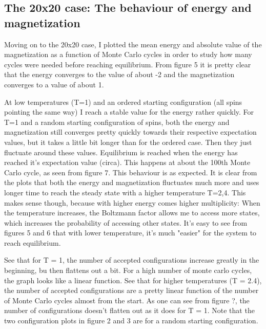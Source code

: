 \documentclass[twocolumn]{article}
\begin{document}
\subsection{The 20x20 case: The behaviour of energy and magnetization}

Moving on to the 20x20 case, I plotted the mean energy and absolute value of the magnetization as a function of Monte Carlo cycles in order to study how many cycles were needed before reaching equilibrium. From figure 5 it is pretty clear that the energy converges to the value of about -2 and the magnetization converges to a value of about 1.\newline

At low temperatures (T=1) and an ordered starting configuration (all spins pointing the same way) I reach a stable value for the energy rather quickly.  
For T=1 and a random starting configuration of spins, both the energy and magnetization still converges pretty quickly towards their respective expectation values, but it takes a little bit longer than for the ordered case. Then they just fluctuate around these values. Equilibrium is reached when the energy has reached it's expectation value (circa). This happens at about the 100th Monte Carlo cycle, as seen from figure 7. This behaviour is as expected.\newline
It is clear from the plots that both the energy and magnetization fluctuates much more and uses longer time to reach the steady state with a higher temperature T=2,4. This makes sense though, because with higher energy comes higher multiplicity: When the temperature increases, the Boltzmann factor allows me to access more states, which increases the probability of accessing other states.\newline
It's easy to see from figures 5 and 6 that with lower temperature, it's much "easier" for the system to reach equilibrium. \newline

See that for T = 1, the number of accepted configurations increase greatly in the beginning, bu then flattens out a bit.
For a high number of monte carlo cycles, the graph looks like a linear function.
See that for higher temperatures (T = 2.4), the number of accepted configurations are a pretty linear function of the number of Monte Carlo cycles almost from the start. As one can see from figure ?, the number of configurations doesn't flatten out as it does for T = 1. Note that the two configuration plots in figure 2 and 3 are for a random starting configuration.\newline
\end{document}
